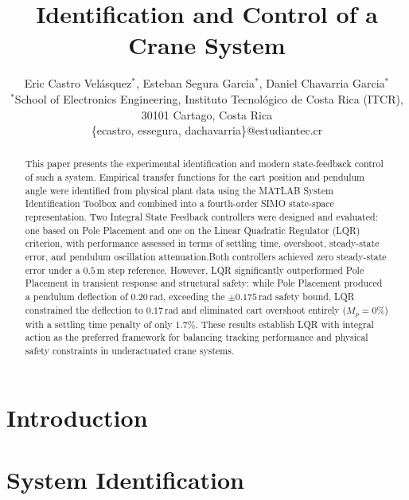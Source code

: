 \documentclass[journal,twocolumn]{IEEEtran}
\begin{document}
\title{Identification and Control of a Crane System}

\author{
Eric Castro Vel\'asquez$^{*}$,
Esteban Segura Garcia$^{*}$,
Daniel Chavarria Garcia$^{*}$\\
\small $^{*}$School of Electronics Engineering, Instituto Tecnol\'ogico de Costa Rica (ITCR),\\
\small 30101 Cartago, Costa Rica\\
\small \{ecastro, essegura, dachavarria\}@estudiantec.cr
}

\maketitle

\begin{abstract}
This paper presents the experimental identification and modern state-feedback control of such a system. Empirical transfer functions for the cart position and pendulum angle were identified from physical plant data using the MATLAB System Identification Toolbox and combined into a fourth-order SIMO state-space representation. Two Integral State Feedback controllers were designed and evaluated: one based on Pole Placement and one on the Linear Quadratic Regulator (LQR) criterion, with performance assessed in terms of settling time, overshoot, steady-state error, and pendulum oscillation attenuation.Both controllers achieved zero steady-state error under a $0.5\,\text{m}$ step reference. However, LQR significantly outperformed Pole Placement in transient response and structural safety: while Pole Placement produced a pendulum deflection of $0.20\,\text{rad}$, exceeding the $\pm0.175\,\text{rad}$ safety bound, LQR constrained the deflection to $0.17\,\text{rad}$ and 
eliminated cart overshoot entirely ($M_p = 0\%$) with a settling time penalty of only $1.7\%$. These results establish LQR with integral action as the preferred framework for balancing tracking performance and physical safety constraints in underactuated crane systems.
\end{abstract}

\section{Introduction}


\section{System Identification}
\end{document}
